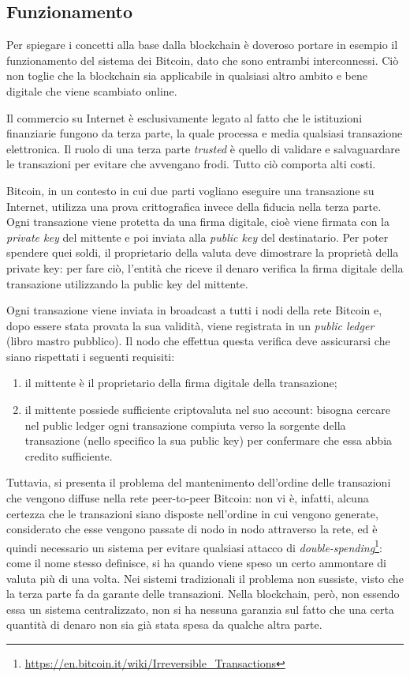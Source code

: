 \subsection{Funzionamento}
\label{c:tec:blockchain:funzionamento}

Per spiegare i concetti alla base dalla blockchain è doveroso portare in esempio il funzionamento del sistema dei Bitcoin, dato che sono entrambi interconnessi. Ciò non toglie che la blockchain sia applicabile in qualsiasi altro ambito e bene digitale che viene scambiato online.

Il commercio su Internet è esclusivamente legato al fatto che le istituzioni finanziarie fungono da terza parte, la quale processa e media qualsiasi transazione elettronica. Il ruolo di una terza parte \textit{trusted} è quello di validare e salvaguardare le transazioni per evitare che avvengano frodi. Tutto ciò comporta alti costi.

Bitcoin, in un contesto in cui due parti vogliano eseguire una transazione su Internet, utilizza una prova crittografica invece della fiducia nella terza parte. Ogni transazione viene protetta da una firma digitale, cioè viene firmata con la \textit{private key} del mittente e poi inviata alla \textit{public key} del destinatario. Per poter spendere quei soldi, il proprietario della valuta deve dimostrare la proprietà della private key: per fare ciò, l'entità che riceve il denaro verifica la firma digitale della transazione utilizzando la public key del mittente.

Ogni transazione viene inviata in broadcast a tutti i nodi della rete Bitcoin e, dopo essere stata provata la sua validità, viene registrata in un \textit{public ledger} (libro mastro pubblico). Il nodo che effettua questa verifica deve assicurarsi che siano rispettati i seguenti requisiti:
\begin{enumerate}
    \item il mittente è il proprietario della firma digitale della transazione;
    \item il mittente possiede sufficiente criptovaluta nel suo account: bisogna cercare nel public ledger ogni transazione compiuta verso la sorgente della transazione (nello specifico la sua public key) per confermare che essa abbia credito sufficiente.
\end{enumerate}

Tuttavia, si presenta il problema del mantenimento dell'ordine delle transazioni che vengono diffuse nella rete peer-to-peer Bitcoin: non vi è, infatti, alcuna certezza che le transazioni siano disposte nell'ordine in cui vengono generate, considerato che esse vengono passate di nodo in nodo attraverso la rete, ed è quindi necessario un sistema per evitare qualsiasi attacco di \textit{double-spending}\footnote{\url{https://en.bitcoin.it/wiki/Irreversible_Transactions}}: come il nome stesso definisce, si ha quando viene speso un certo ammontare di valuta più di una volta. Nei sistemi tradizionali il problema non sussiste, visto che la terza parte fa da garante delle transazioni. Nella blockchain, però, non essendo essa un sistema centralizzato, non si ha nessuna garanzia sul fatto che una certa quantità di denaro non sia già stata spesa da qualche altra parte.

